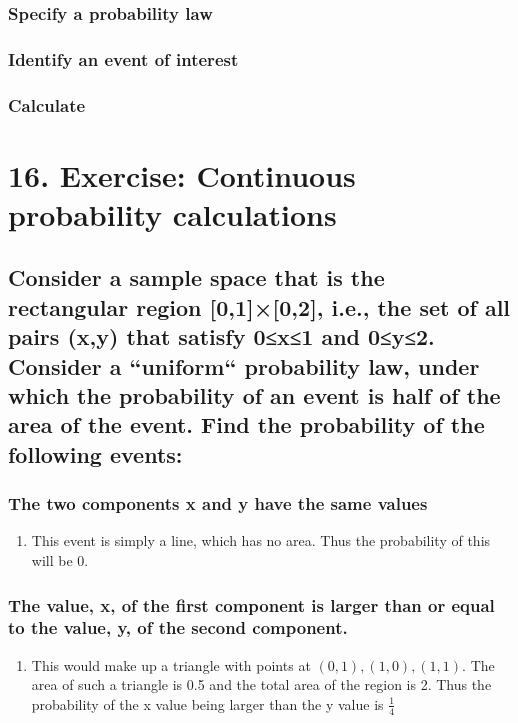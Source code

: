 \documentclass[11pt]{article}
\begin{document}
\subsubsection{Specify a probability law}
\label{sec:org6c6305b}
\subsubsection{Identify an event of interest}
\label{sec:orgeaa6241}
\subsubsection{Calculate}
\label{sec:orgd4ac1ff}
\section{16. Exercise: Continuous probability calculations}
\label{sec:org96c9a14}
\subsection{Consider a sample space that is the rectangular region [0,1]×[0,2], i.e., the set of all pairs (x,y) that satisfy 0≤x≤1 and 0≤y≤2. Consider a “uniform`` probability law, under which the probability of an event is half of the area of the event. Find the probability of the following events:}
\label{sec:org0803448}
\subsubsection{The two components x and y have the same values}
\label{sec:org61a5499}
\begin{enumerate}
\item This event is simply a line, which has no area. Thus the probability of this will be \(0\).
\label{sec:orgec085fa}
\end{enumerate}
\subsubsection{The value, x, of the first component is larger than or equal to the value, y, of the second component.}
\label{sec:orgd48a526}
\begin{enumerate}
\item This would make up a triangle with points at \((0,1),(1,0),(1,1)\). The area of such a triangle is 0.5 and the total area of the region is 2. Thus the probability of the x value being larger than the y value is \(\frac{1}{4}\)
\label{sec:org62d089d}
\end{enumerate}
\end{document}
